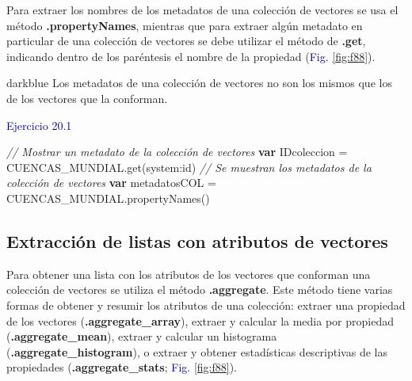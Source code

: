 \documentclass[
  12pt,
  letterpaper,
  twoside]{book}
\newenvironment{Shaded}{\begin{snugshade}}{\end{snugshade}}
\newcommand{\CommentTok}[1]{\textcolor[rgb]{0.24,0.58,0.00}{\textit{#1}}}
\newcommand{\ControlFlowTok}[1]{\textcolor[rgb]{0.00,0.00,0.00}{\textbf{#1}}}
\newcommand{\FunctionTok}[1]{\textcolor[rgb]{0.48,0.12,0.64}{#1}}
\newcommand{\NormalTok}[1]{#1}
\newcommand{\OperatorTok}[1]{\textcolor[rgb]{0.00,0.00,0.00}{#1}}
\newcommand{\StringTok}[1]{\textcolor[rgb]{0.87,0.29,0.22}{#1}}
\newcommand\boldpurple[1]{\textcolor{darkpurple}{\textbf{#1}}}
\begin{document}
Para extraer los nombres de los metadatos de una colección de vectores se usa el método \boldpurple{.propertyNames}, mientras que para extraer algún metadato en particular de una colección de vectores se debe utilizar el método de \boldpurple{.get}, indicando dentro de los paréntesis el nombre de la propiedad (\textcolor{darkblue}{Fig.} \ref{fig:f88}).

\begin{bluebox2}

\begin{awesomeblock}{5pt}{\faLightbulb}{darkblue}
Los metadatos de una colección de vectores no son los mismos que los de los vectores que la conforman.

\end{awesomeblock}

\end{bluebox2}

\textcolor{darkblue}{Ejercicio 20.1}

\begin{Shaded}
\begin{Highlighting}[]
\CommentTok{// Mostrar un metadato de la colección de vectores}
\ControlFlowTok{var}\NormalTok{ IDcoleccion }\OperatorTok{=}\NormalTok{ CUENCAS\_MUNDIAL}\OperatorTok{.}\FunctionTok{get}\NormalTok{(}\StringTok{\textquotesingle{}system:id\textquotesingle{}}\NormalTok{) }
\CommentTok{// Se muestran los metadatos de la colección de vectores}
\ControlFlowTok{var}\NormalTok{ metadatosCOL }\OperatorTok{=}\NormalTok{ CUENCAS\_MUNDIAL}\OperatorTok{.}\FunctionTok{propertyNames}\NormalTok{()}
\end{Highlighting}
\end{Shaded}

\hypertarget{extracciuxf3n-de-listas-con-atributos-de-vectores}{%
\subsection*{Extracción de listas con atributos de vectores}\label{extracciuxf3n-de-listas-con-atributos-de-vectores}}

Para obtener una lista con los atributos de los vectores que conforman una colección de vectores se utiliza el método \boldpurple{.aggregate}. Este método tiene varias formas de obtener y resumir los atributos de una colección: extraer una propiedad de los vectores (\boldpurple{.aggregate\_array}), extraer y calcular la media por propiedad (\boldpurple{.aggregate\_mean}), extraer y calcular un histograma (\boldpurple{.aggregate\_histogram}), o extraer y obtener estadísticas descriptivas de las propiedades (\boldpurple{.aggregate\_stats}; \textcolor{darkblue}{Fig.} \ref{fig:f88}).
\end{document}
